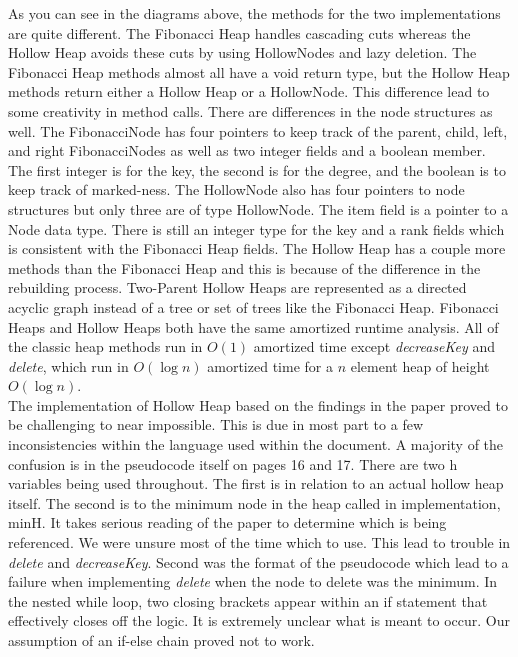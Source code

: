 \documentclass[letter,10pt]{article}
\begin{document}
\quad As you can see in the diagrams above, the methods for the two implementations are quite different. The Fibonacci Heap handles cascading cuts whereas the Hollow Heap avoids these cuts by using HollowNodes and lazy deletion. The Fibonacci Heap methods almost all have a void return type, but the Hollow Heap methods return either a Hollow Heap or a HollowNode. This difference lead to some creativity in method calls. There are differences in the node structures as well. The FibonacciNode has four pointers to keep track of the parent, child, left, and right FibonacciNodes as well as two integer fields and a boolean member. The first integer is for the key, the second is for the degree, and the boolean is to keep track of marked-ness. The HollowNode also has four pointers to node structures but only three are of type HollowNode. The item field is a pointer to a Node data type. There is still an integer type for the key and a rank fields which is consistent with the Fibonacci Heap fields. The Hollow Heap has a couple more methods than the Fibonacci Heap and this is because of the difference in the rebuilding process. Two-Parent Hollow Heaps are represented as a directed acyclic graph instead of a tree or set of trees like the Fibonacci Heap. Fibonacci Heaps and Hollow Heaps both have the same amortized runtime analysis. All of the classic heap methods run in $O(1)$ amortized time except \textit{decreaseKey} and \textit{delete}, which run in $O(\log n)$ amortized time for a $n$ element heap of height $O(\log n)$.\\

The implementation of Hollow Heap based on the findings in the paper proved to be challenging to near impossible. This is due in most part to a few inconsistencies within the language used within the document. A majority of the confusion is in the pseudocode itself on pages 16 and 17. There are two h variables being used throughout. The first is in relation to an actual hollow heap itself. The second is to the minimum node in the heap called in implementation, minH. It takes serious reading of the paper to determine which is being referenced. We were unsure most of the time which to use. This lead to trouble in \textit{delete} and \textit{decreaseKey}. Second was the format of the pseudocode which lead to a failure when implementing \textit{delete} when the node to delete was the minimum.  In the nested while loop, two closing brackets appear within an if statement that effectively closes off the logic. It is extremely unclear what is meant to occur. Our assumption of an if-else chain proved not to work.\\
\end{document}
